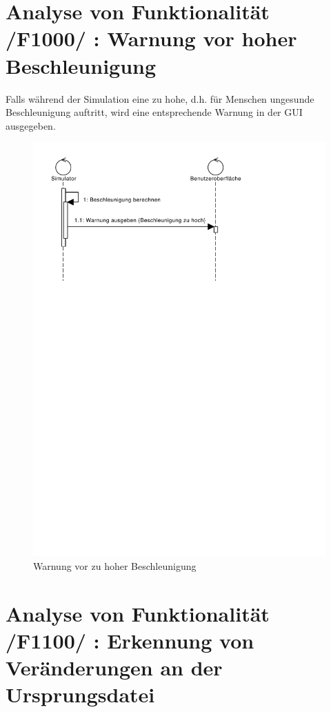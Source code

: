 \section{Analyse von Funktionalität /F1000/ :  Warnung vor hoher Beschleunigung}
Falls während der Simulation eine zu hohe, d.h. für Menschen ungesunde Beschleunigung auftritt, wird eine entsprechende Warnung in der GUI ausgegeben.
\begin{figure}
\includegraphics[width=16cm]{bilder/Warnung_Beschleunigung}
\caption{Warnung vor zu hoher Beschleunigung}
\label{labelname}
\end{figure}
\section{Analyse von Funktionalität /F1100/ :  Erkennung von Veränderungen an der Ursprungsdatei}
